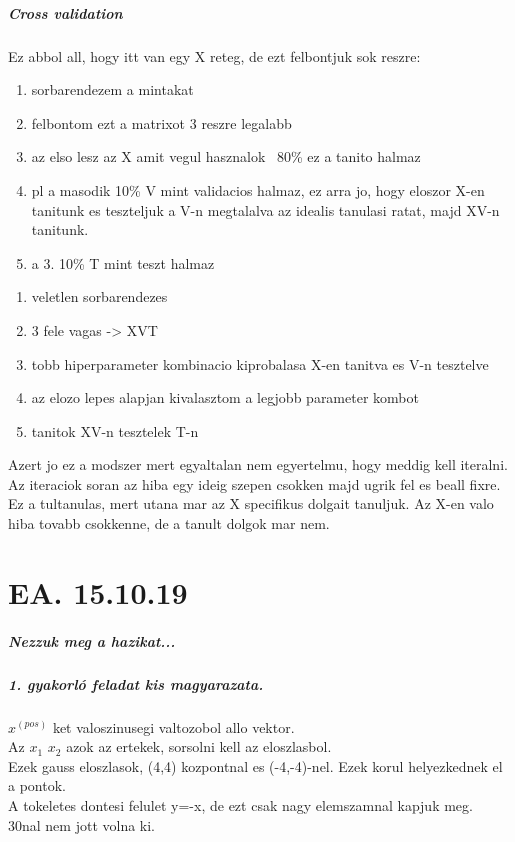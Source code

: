 \documentclass[10pt,a4paper]{report}
\begin{document}
\paragraph{Cross validation}
Ez abbol all, hogy itt van egy X reteg, de ezt felbontjuk sok reszre:
\begin{enumerate}
\item sorbarendezem a mintakat
\item felbontom ezt a matrixot 3 reszre legalabb
\item az elso lesz az X amit vegul hasznalok ~80\% ez a tanito halmaz
\item pl a masodik 10\% V mint validacios halmaz, ez arra jo, hogy eloszor X-en tanitunk es teszteljuk a V-n megtalalva az idealis tanulasi ratat, majd XV-n tanitunk.
\item a 3. 10\% T mint teszt halmaz
\end{enumerate}

\begin{enumerate}
\item veletlen sorbarendezes
\item 3 fele vagas -> XVT
\item tobb hiperparameter kombinacio kiprobalasa X-en tanitva es V-n tesztelve
\item az elozo lepes alapjan kivalasztom a legjobb parameter kombot
\item tanitok XV-n tesztelek T-n
\end{enumerate}
Azert jo ez a modszer mert egyaltalan nem egyertelmu, hogy meddig kell iteralni. Az iteraciok soran az hiba egy ideig szepen csokken majd ugrik fel es beall fixre. Ez a tultanulas, mert utana mar az X specifikus dolgait tanuljuk. Az X-en valo hiba tovabb csokkenne, de a tanult dolgok mar nem.

\chapter{EA. 15.10.19}
\paragraph{Nezzuk meg a hazikat...}
\paragraph{1. gyakorló feladat kis magyarazata.}
$x^{(pos)}$ ket valoszinusegi valtozobol allo vektor.\\
Az $x_1$ $x_2$ azok az ertekek, sorsolni kell az eloszlasbol.\\
Ezek gauss eloszlasok, (4,4) kozpontnal es (-4,-4)-nel. Ezek korul helyezkednek el a pontok. \\
A tokeletes dontesi felulet y=-x, de ezt csak nagy elemszamnal kapjuk meg.\\
30nal nem jott volna ki.\\
\end{document}
